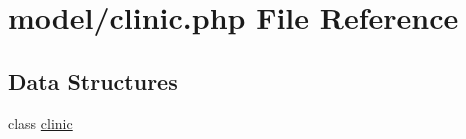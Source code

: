 \hypertarget{clinic_8php}{}\section{model/clinic.php File Reference}
\label{clinic_8php}
\subsection*{Data Structures}
\begin{DoxyCompactItemize}
\item 
class \hyperlink{classclinic}{clinic}
\end{DoxyCompactItemize}
